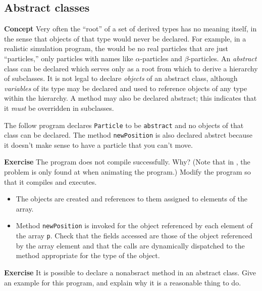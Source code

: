 \subsection{Abstract classes}\label{inher.06}

\textbf{Concept} Very often the ``root'' of a set of derived types has no 
meaning itself, in the sense that objects of that type would never be 
declared. For example, in a realistic simulation program, the would be no 
real particles that are just ``particles,'' only particles with names like 
$\alpha$-particles and $\beta$-particles.
An \emph{abstract} class can be declared which serves only as a root from 
which to derive a hierarchy of subclasses. 
It is not legal to declare \emph{objects} of an abstract class, 
although \emph{variables} of its type may be declared and used to 
reference objects of any type within the hierarchy. A method may also be 
declared abstract; this indicates that it \emph{must} be overridden in 
subclasses.


The follow program declares \texttt{Particle} to
be \texttt{abstract} and no objects of that class can be declared. The
method \texttt{newPosition} is also declared abstrct because it doesn't
make sense to have a particle that you can't move.

\textbf{Exercise} The program does not compile successfully. Why? (Note that
in \jel{}, the problem is only found at when animating the program.)
Modify the program so that it compiles and executes.

\begin{itemize}
  \item The objects are created and references to them assigned to 
  elements of the array.
  \item Method \texttt{newPosition} is invoked for the object referenced 
  by each element of the array \texttt{p}. 
  Check that the fields accessed are those of the object referenced by the
  array element and that the calls are dynamically dispatched to the method
  appropriate for the type of the object.
\end{itemize}

\textbf{Exercise} It is possible to declare a nonabsract method in an 
abstract class. Give an example for this program, and explain why it is a 
reasonable thing to do.
